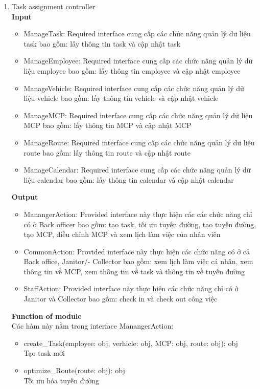 \documentclass[a4paper]{article}
\begin{document}
\begin{enumerate}
           \item Task assignment controller \\
 \textbf{Input}
 \begin{itemize}
    \item ManageTask: Required interface cung cấp các chức năng quản lý dữ liệu task bao gồm: lấy thông tin task và cập nhật task
    \item ManageEmployee: Required interface cung cấp các chức năng quản lý dữ liệu employee bao gồm: lấy thông tin employee và cập nhật employee
    \item ManageVehicle: Required interface cung cấp các chức năng quản lý dữ liệu vehicle bao gồm: lấy thông tin vehicle và cập nhật vehicle
    \item ManageMCP: Required interface cung cấp các chức năng quản lý dữ liệu  MCP bao gồm: lấy thông tin MCP và cập nhật MCP
    \item ManageRoute: Required interface cung cấp các chức năng quản lý dữ liệu route bao gồm: lấy thông tin route và cập nhật route
    \item ManageCalendar: Required interface cung cấp các chức năng quản lý dữ liệu calendar bao gồm: lấy thông tin calendar và cập nhật calendar
 \end{itemize}
  \textbf{Output}
   \begin{itemize}
     \item ManangerAction: Provided interface này thực hiện các các chức năng chỉ có ở Back officer bao
gồm: tạo task, tối ưu tuyến đường, tạo tuyến đường, tạo MCP, điều chỉnh MCP và xem lịch
làm việc của nhân viên
    \item CommonAction: Provided interface này thực hiện các chức năng có ở cả Back office, Janitor/-
Collector bao gồm: xem lịch làm việc cá nhân, xem thông tin về MCP, xem thông tin về task
và thông tin về tuyến đường
    \item StaffAction: Provided interface này thực hiện các chức năng chỉ có ở Janitor và Collector bao
gồm: check in và check out công việc
 \end{itemize}
  \textbf{Function of module}\\
  Các hàm này nằm trong interface ManangerAction:
     \begin{itemize}
 \item create\_Task(employee: obj, verhicle: obj, MCP: obj, route: obj): obj 
 \\ Tạo task mới
\item optimize\_Route(route: obj): obj
\\ Tối ưu hóa tuyến đường

\end{itemize}
\end{enumerate}
\end{document}
